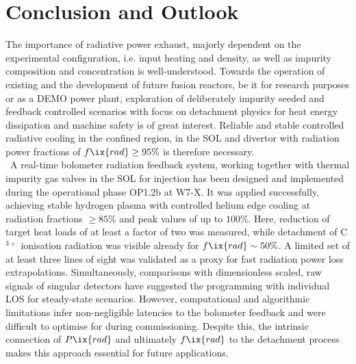 %
\chapter{Conclusion and Outlook}\label{chap:conclusion}%
%
    The importance of radiative power exhaust, majorly dependent on the experimental configuration, i.e. input heating and density, as well as impurity composition and concentration is well-understood. Towards the operation of existing and the development of future fusion reactors, be it for research purposes or as a DEMO power plant, exploration of deliberately impurity seeded  and feedback controlled scenarios with focus on detachment physics for heat energy dissipation and machine safety is of great interest. Reliable and stable controlled radiative cooling in the confined region, in the SOL and divertor with radiation power fractions of $f\ix{rad}\ge95\%$ is therefore necessary.\\%
%
    \,\newline%
    A real-time bolometer radiation feedback system, working together with thermal impurity gas valves in the SOL for injection has been designed and implemented during the operational phase OP1.2b at W7-X. It was applied successfully, achieving stable hydrogen plasma with controlled helium edge cooling at radiation fractions $\ge85\%$ and peak values of up to $100\%$. Here, reduction of target heat loads of at least a factor of two was measured, while detachment of C$^{3+}$ ionisation radiation was visible already for $f\ix{rad}\sim50\%$. A limited set of at least three lines of sight was validated as a proxy for fast radiation power loss extrapolations. Simultaneously, comparisons with dimensionless scaled, raw signals of singular detectors have suggested the programming with individual LOS for steady-state scenarios. However, computational and algorithmic limitations infer non-negligible latencies to the bolometer feedback and were difficult to optimise for during commissioning. Despite this, the intrinsic connection of $P\ix{rad}$ and ultimately $f\ix{rad}$ to the detachment process makes this approach essential for future applications.\\%
%
    \,\newline%
